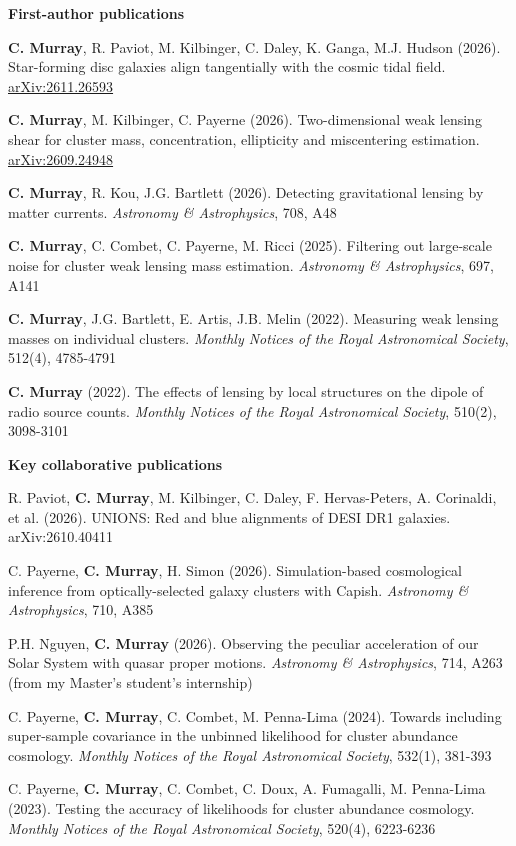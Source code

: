 \documentclass[11pt]{article}
\begin{document}
\textbf{First-author publications}

\nopagebreak
\textbf{C. Murray}, R. Paviot, M. Kilbinger, C. Daley, K. Ganga, M.J. Hudson (2026). Star-forming disc galaxies align tangentially with the cosmic tidal field. \href{https://arxiv.org/abs/2611.26593}{arXiv:2611.26593}

\textbf{C. Murray}, M. Kilbinger, C. Payerne (2026). Two-dimensional weak lensing shear for cluster mass, concentration, ellipticity and miscentering estimation. \href{https://arxiv.org/abs/2609.24948}{arXiv:2609.24948}

\textbf{C. Murray}, R. Kou, J.G. Bartlett (2026). Detecting gravitational lensing by matter currents. \textit{Astronomy \& Astrophysics}, 708, A48

\textbf{C. Murray}, C. Combet, C. Payerne, M. Ricci (2025). Filtering out large-scale noise for cluster weak lensing mass estimation. \textit{Astronomy \& Astrophysics}, 697, A141

\textbf{C. Murray}, J.G. Bartlett, E. Artis, J.B. Melin (2022). Measuring weak lensing masses on individual clusters. \textit{Monthly Notices of the Royal Astronomical Society}, 512(4), 4785-4791

\textbf{C. Murray} (2022). The effects of lensing by local structures on the dipole of radio source counts. \textit{Monthly Notices of the Royal Astronomical Society}, 510(2), 3098-3101

\textbf{Key collaborative publications}

\nopagebreak
R. Paviot, \textbf{C. Murray}, M. Kilbinger, C. Daley, F. Hervas-Peters, A. Corinaldi, et al. (2026). UNIONS: Red and blue alignments of DESI DR1 galaxies. arXiv:2610.40411

C. Payerne, \textbf{C. Murray}, H. Simon (2026). Simulation-based cosmological inference from optically-selected galaxy clusters with Capish. \textit{Astronomy \& Astrophysics}, 710, A385

P.H. Nguyen, \textbf{C. Murray} (2026). Observing the peculiar acceleration of our Solar System with quasar proper motions. \textit{Astronomy \& Astrophysics}, 714, A263 (from my Master's student's internship)

C. Payerne, \textbf{C. Murray}, C. Combet, M. Penna-Lima (2024). Towards including super-sample covariance in the unbinned likelihood for cluster abundance cosmology. \textit{Monthly Notices of the Royal Astronomical Society}, 532(1), 381-393

C. Payerne, \textbf{C. Murray}, C. Combet, C. Doux, A. Fumagalli, M. Penna-Lima (2023). Testing the accuracy of likelihoods for cluster abundance cosmology. \textit{Monthly Notices of the Royal Astronomical Society}, 520(4), 6223-6236
\end{document}
